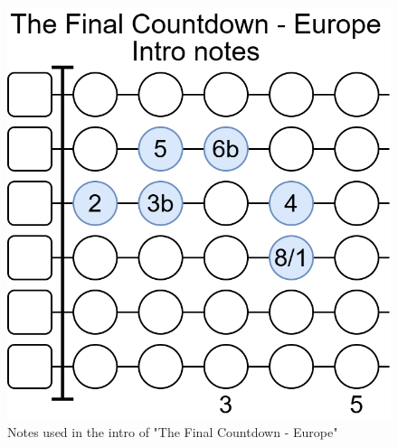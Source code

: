 \begin{figure}[h]
	\centering
	\includegraphics[height=0.2\textheight]{../../Images/NotesUsedInTheFinalCountdownEuropeIntro.png}
	\caption{Notes used in the intro of "The Final Countdown - Europe"}
	\label{fig:guitar_the_final_countdown_europe_fretboard_minor_scale}
\end{figure}



